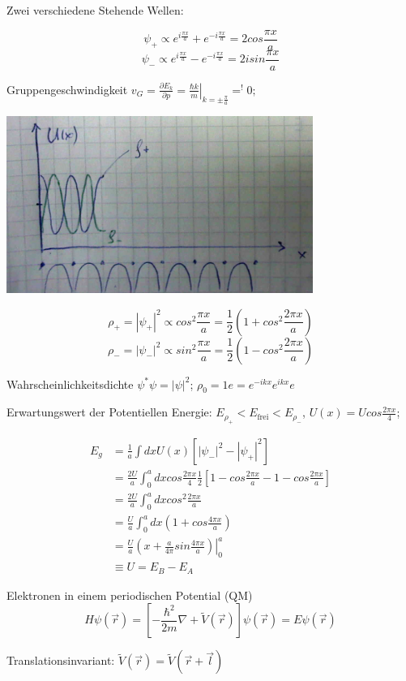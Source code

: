 Zwei verschiedene Stehende Wellen:

\[ \psi_+ \propto e^{i\frac{\pi x}{a}}+e^{-i\frac{\pi x}{a}}=2cos\frac{\pi x}{a} \]
\[ \psi_- \propto e^{i\frac{\pi x}{a}}-e^{-i\frac{\pi x}{a}}=2isin\frac{\pi x}{a} \]

Gruppengeschwindigkeit \(v_G = \frac{\partial E_k}{\partial p} = \left.\frac{\hbar k}{m}\right|_{k=\pm\frac{\pi}{a}}=^!0;\)

\includegraphics[width=0.75\textwidth]{kap06_34.png}

\[\rho_+=|\psi_+|^2 \propto cos^2\frac{\pi x}{a} = \frac{1}{2}(1+cos^2\frac{2\pi x}{a})\]
\[\rho_-=|\psi_-|^2 \propto sin^2\frac{\pi x}{a} = \frac{1}{2}(1-cos^2\frac{2\pi x}{a})\]


Wahrscheinlichkeitsdichte \(\psi^*\psi=|\psi|^2\); \(\rho_0=1e=e^{-ikx}e^{ikx}e\)

Erwartungswert der Potentiellen Energie: \(E_{\rho_+}<E_{\text{frei}}<E_{\rho_-}\), \(U(x)=U cos\frac{2\pi x}{4}\); 

\begin{align}
E_g &= \frac{1}{a}\int dx U(x)[|\psi_-|^2-|\psi_+|^2]\\
&=\frac{2U}{a}\int_0^a dx cos\frac{2\pi x}{4}\frac{1}{2}[1-cos\frac{2\pi x}{a}-1-cos\frac{2\pi x}{a}]\\
&= \frac{2U}{a}\int_0^a dx cos^2\frac{2\pi x}{a}\\
&= \frac{U}{a}\int_0^a dx (1+cos\frac{4\pi x}{a})\\
&=\frac{U}{a}\left.(x+\frac{a}{4\pi}sin\frac{4\pi x}{a})\right|_0^a \\
&\equiv U = E_B-E_A
\end{align}


Elektronen in einem periodischen Potential (QM)
\[ H\psi(\vec r) = [-\frac{\hbar^2}{2m}\nabla+\tilde V(\vec r) ]\psi (\vec r) = E\psi(\vec r) \]

Translationsinvariant: \(\tilde V(\vec r) = \tilde V(\vec r+\vec l)\)

